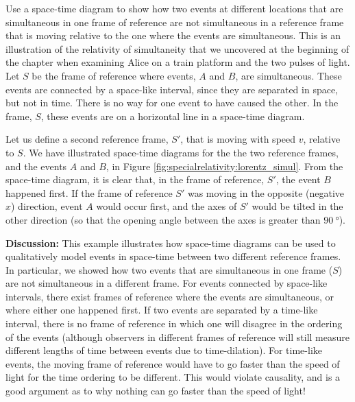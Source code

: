 \begin{example}{Use a space-time diagram to show how two events at different locations that are simultaneous in one frame of reference are not simultaneous in a reference frame that is moving relative to the one where the events are simultaneous. This is an illustration of the relativity of simultaneity that we uncovered at the beginning of the chapter when examining Alice on a train platform and the two pulses of light.}
Let $S$ be the frame of reference where events, $A$ and $B$, are simultaneous. These events are connected by a space-like interval, since they are separated in space, but not in time. There is no way for one event to have caused the other. In the frame, $S$, these events are on a horizontal line in a space-time diagram.

Let us define a second reference frame, $S'$, that is moving with speed $v$, relative to $S$. We have illustrated space-time diagrams for the the two reference frames, and the events $A$ and $B$, in Figure \ref{fig:specialrelativity:lorentz_simul}.
From the space-time diagram, it is clear that, in the frame of reference, $S'$, the event $B$ happened first. If the frame of reference $S'$ was moving in the opposite (negative $x$) direction, event $A$ would occur first, and the axes of $S'$ would be tilted in the other direction (so that the opening angle between the axes is greater than $\SI{90}{\degree}$).

\textbf{Discussion: }This example illustrates how space-time diagrams can be used to qualitatively model events in space-time between two different reference frames. In particular, we showed how two events that are simultaneous in one frame ($S$) are not simultaneous in a different frame. For events connected by space-like intervals, there exist frames of reference where the events are simultaneous, or where either one happened first. If two events are separated by a time-like interval, there is no frame of reference in which one will disagree in the ordering of the events (although observers in different frames of reference will still measure different lengths of time between events due to time-dilation). For time-like events, the moving frame of reference would have to go faster than the speed of light for the time ordering to be different. This would violate causality, and is a good argument as to why nothing can go faster than the speed of light!
\end{example}

